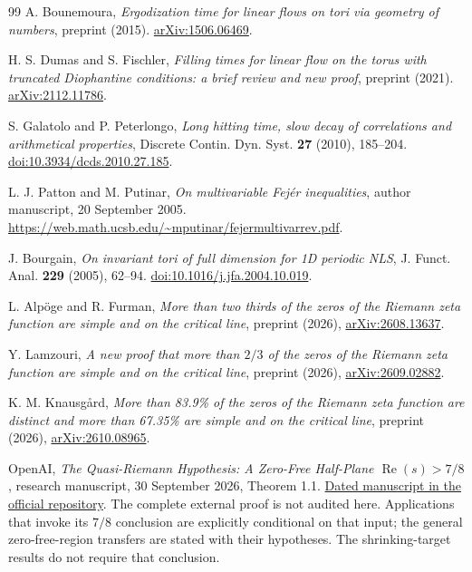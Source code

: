 \documentclass[11pt,letterpaper]{article}
\theoremstyle{definition}
\theoremstyle{remark}
\renewcommand{\Re}{\operatorname{Re}}
\newcommand{\1}{\mathbf 1}
\begin{document}
\begin{thebibliography}{99}
A. Bounemoura,
\emph{Ergodization time for linear flows on tori via geometry of numbers},
preprint (2015).
\href{https://arxiv.org/abs/1506.06469}{arXiv:1506.06469}.


H. S. Dumas and S. Fischler,
\emph{Filling times for linear flow on the torus with truncated
Diophantine conditions: a brief review and new proof}, preprint (2021).
\href{https://arxiv.org/abs/2112.11786}{arXiv:2112.11786}.


S. Galatolo and P. Peterlongo,
\emph{Long hitting time, slow decay of correlations and arithmetical
properties}, Discrete Contin. Dyn. Syst. \textbf{27} (2010), 185--204.
\href{https://doi.org/10.3934/dcds.2010.27.185}{doi:10.3934/dcds.2010.27.185}.


L. J. Patton and M. Putinar,
\emph{On multivariable Fej\'er inequalities},
author manuscript, 20 September 2005.
\url{https://web.math.ucsb.edu/~mputinar/fejermultivarrev.pdf}.


J. Bourgain,
\emph{On invariant tori of full dimension for 1D periodic NLS},
J. Funct. Anal. \textbf{229} (2005), 62--94.
\href{https://doi.org/10.1016/j.jfa.2004.10.019}{doi:10.1016/j.jfa.2004.10.019}.


L. Alp\"oge and R. Furman,
\emph{More than two thirds of the zeros of the Riemann zeta function
are simple and on the critical line}, preprint (2026),
\href{https://arxiv.org/abs/2608.13637}{arXiv:2608.13637}.


Y. Lamzouri,
\emph{A new proof that more than $2/3$ of the zeros of the Riemann
zeta function are simple and on the critical line}, preprint (2026),
\href{https://arxiv.org/abs/2609.02882}{arXiv:2609.02882}.


K. M. Knausg\aa rd,
\emph{More than 83.9\% of the zeros of the Riemann zeta function
are distinct and more than 67.35\% are simple and on the critical line},
preprint (2026),
\href{https://arxiv.org/abs/2610.08965}{arXiv:2610.08965}.


OpenAI,
\emph{The Quasi-Riemann Hypothesis: A Zero-Free Half-Plane
$\Re(s)>7/8$}, research manuscript, 30 September 2026,
Theorem 1.1.
\href{https://github.com/openai/math/blob/main/preprints/The-Quasi-Riemann-Hypothesis-September-30-2026/paper.pdf}{Dated manuscript in the official repository}.
The complete external proof is not audited here. Applications that
invoke its $7/8$ conclusion are explicitly conditional on that input;
the general zero-free-region transfers are stated with their hypotheses. The shrinking-target results do not require that conclusion.



\end{thebibliography}
\end{document}
